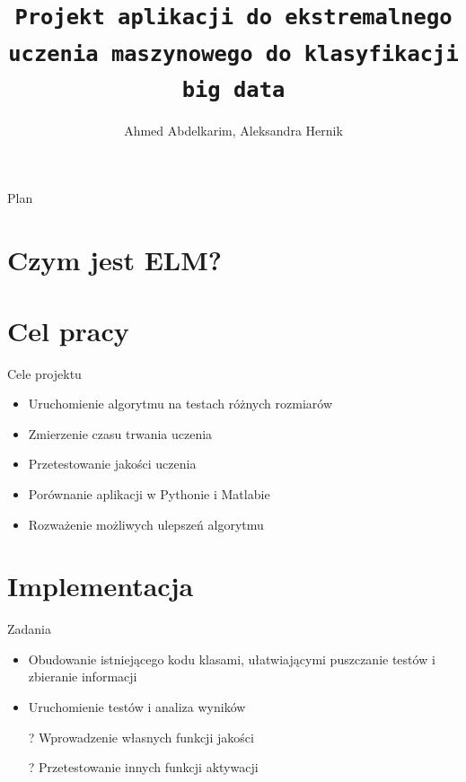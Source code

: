 \documentclass{beamer}
\title{\texttt{Projekt aplikacji do ekstremalnego uczenia maszynowego do klasyfikacji big data}}
\author{Ahmed Abdelkarim, Aleksandra Hernik}
\begin{document}


\begin{frame}
  \maketitle
\end{frame}

\begin{frame}{Plan}
  \tableofcontents[currentsection]
\end{frame}

\section{Czym jest ELM?}
\begin{frame}{1}
\end{frame}
\begin{frame}{1}
\end{frame}
\section{Cel pracy}
\begin{frame}{Cele projektu}
\begin{itemize}
\item Uruchomienie algorytmu na testach różnych rozmiarów
\item Zmierzenie czasu trwania uczenia
\item Przetestowanie jakości uczenia
\item Porównanie aplikacji w Pythonie i Matlabie
\item Rozważenie możliwych ulepszeń algorytmu
\end{itemize}
\end{frame}
\section{Implementacja}
\begin{frame}{Zadania}
\begin{itemize}
\item Obudowanie istniejącego kodu klasami, ułatwiającymi puszczanie testów i zbieranie informacji
\item Uruchomienie testów i analiza wyników
\item[?] Wprowadzenie własnych funkcji jakości 
\item[?] Przetestowanie innych funkcji aktywacji
\end{itemize}
\end{frame}
\end{document}
